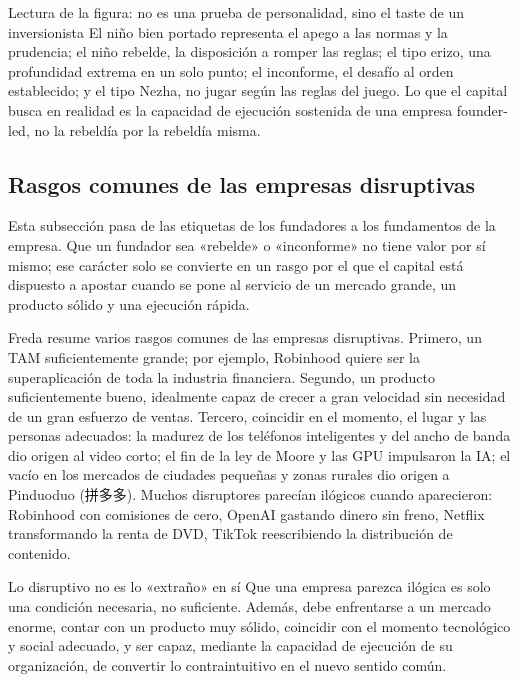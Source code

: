 \documentclass[a4paper]{article}
\begin{document}
\begin{knowledgebox}{Lectura de la figura: no es una prueba de personalidad, sino el taste de un inversionista}
El niño bien portado representa el apego a las normas y la prudencia; el niño rebelde, la disposición a romper las reglas; el tipo erizo, una profundidad extrema en un solo punto; el inconforme, el desafío al orden establecido; y el tipo Nezha, no jugar según las reglas del juego. Lo que el capital busca en realidad es la capacidad de ejecución sostenida de una empresa founder-led, no la rebeldía por la rebeldía misma.
\end{knowledgebox}

\subsection{Rasgos comunes de las empresas disruptivas}

Esta subsección pasa de las etiquetas de los fundadores a los fundamentos de la empresa. Que un fundador sea «rebelde» o «inconforme» no tiene valor por sí mismo; ese carácter solo se convierte en un rasgo por el que el capital está dispuesto a apostar cuando se pone al servicio de un mercado grande, un producto sólido y una ejecución rápida.

Freda resume varios rasgos comunes de las empresas disruptivas. Primero, un TAM suficientemente grande; por ejemplo, Robinhood quiere ser la superaplicación de toda la industria financiera. Segundo, un producto suficientemente bueno, idealmente capaz de crecer a gran velocidad sin necesidad de un gran esfuerzo de ventas. Tercero, coincidir en el momento, el lugar y las personas adecuados: la madurez de los teléfonos inteligentes y del ancho de banda dio origen al video corto; el fin de la ley de Moore y las GPU impulsaron la IA; el vacío en los mercados de ciudades pequeñas y zonas rurales dio origen a Pinduoduo (拼多多). Muchos disruptores parecían ilógicos cuando aparecieron: Robinhood con comisiones de cero, OpenAI gastando dinero sin freno, Netflix transformando la renta de DVD, TikTok reescribiendo la distribución de contenido.

\begin{importantbox}{Lo disruptivo no es lo «extraño» en sí}
Que una empresa parezca ilógica es solo una condición necesaria, no suficiente. Además, debe enfrentarse a un mercado enorme, contar con un producto muy sólido, coincidir con el momento tecnológico y social adecuado, y ser capaz, mediante la capacidad de ejecución de su organización, de convertir lo contraintuitivo en el nuevo sentido común.
\end{importantbox}
\end{document}

